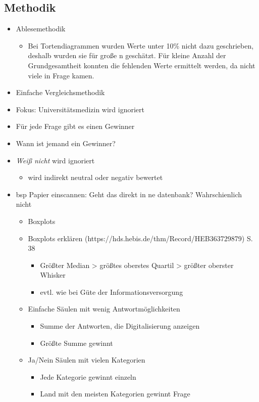 \subsection{Methodik}
\begin{itemize}
	\item Ablesemethodik
	\begin{itemize}
		\item Bei Tortendiagrammen wurden Werte unter 10\% nicht dazu geschrieben, deshalb wurden sie für große n geschätzt. Für kleine Anzahl der Grundgesamtheit konnten die fehlenden Werte ermittelt werden, da nicht viele in Frage kamen.
	\end{itemize}
	\item Einfache Vergleichsmethodik
	\item Fokus: Universitätsmedizin wird ignoriert
	\item Für jede Frage gibt es einen Gewinner
	\item Wann ist jemand ein Gewinner?
	\item \textit{Weiß nicht} wird ignoriert
	\begin{itemize}
		\item wird indirekt neutral oder negativ bewertet
	\end{itemize}
	\item bsp Papier einscannen: Geht das direkt in ne datenbank? Wahrschienlich nicht
	\begin{itemize}
		\item Boxplots
		\item Boxplots erklären (https://hds.hebis.de/thm/Record/HEB363729879) S. 38
		\begin{itemize}
			\item Größter Median > größtes oberstes Quartil > größter oberster Whisker
			\item evtl. wie bei Güte der Informationsversorgung
		\end{itemize}
		\item Einfache Säulen mit wenig Antwortmöglichkeiten
		\begin{itemize}
			\item Summe der Antworten, die Digitalisierung anzeigen
			\item Größte Summe gewinnt
		\end{itemize}
		\item Ja/Nein Säulen mit vielen Kategorien
		\begin{itemize}
			\item Jede Kategorie gewinnt einzeln
			\item Land mit den meisten Kategorien gewinnt Frage

\end{itemize}
\end{itemize}
\end{itemize}
